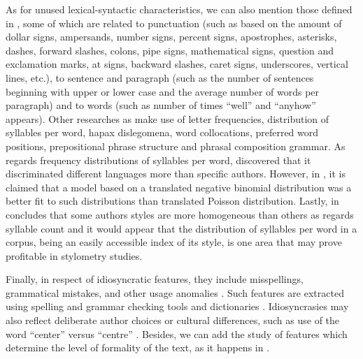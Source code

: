 As for unused lexical-syntactic characteristics, we can also mention those defined in \cite{calix2008stylometry}, some of which are related to punctuation (such as based on the amount of dollar signs, ampersands, number signs, percent signs, apostrophes, asterisks, dashes, forward slashes, colons, pipe signs, mathematical signs, question and exclamation marks, at signs, backward slashes, caret signs, underscores, vertical lines, etc.), to sentence and paragraph (such as the number of sentences beginning with upper or lower case and the average number of words per paragraph) and to words (such as number of times ``well'' and ``anyhow'' appears). Other researches as \cite{corney2001identifying} make use of letter frequencies, distribution of syllables per word, hapax dislegomena, word collocations, preferred word positions, prepositional phrase structure and phrasal composition grammar. As regards frequency distributions of syllables per word, \cite{fucks1965mathematische} discovered that it discriminated different languages more than specific authors. However, in \cite{brainerd1974weighting}, it is claimed that a model based on a translated negative binomial distribution was a better fit to such distributions than \cite{fucks1965mathematische} translated Poisson distribution. Lastly, in \cite{brainerd1974weighting} concludes that some authors styles are more homogeneous than others as regards syllable count and it would appear that the distribution of syllables per word in a corpus, being an easily accessible index of its style, is one area that may prove profitable in stylometry studies.

Finally, in respect of idiosyncratic features, they include misspellings, grammatical mistakes, and other usage anomalies \citep{abbasi2008writeprints}. Such features are extracted using spelling and grammar checking tools and dictionaries \citep{chaski2001empirical}. Idiosyncrasies may also reflect deliberate author choices or cultural differences, such as use of the word ``center'' versus ``centre'' \citep{koppel2003exploiting}. Besides, we can add the study of features which determine the level of formality of the text, as it happens in \cite{sheika2012learning}.